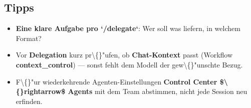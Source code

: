 \subsection{Tipps}

\begin{itemize}
\item \textbf{Eine klare Aufgabe pro `/delegate`}: Wer soll was liefern, in welchem Format?
\item Vor \textbf{Delegation} kurz pr\textbackslash\{\}"ufen, ob \textbf{Chat-Kontext} passt (Workflow \textbf{context\_control}) --- sonst fehlt dem Modell der gew\textbackslash\{\}"unschte Bezug.
\item F\textbackslash\{\}"ur wiederkehrende Agenten-Einstellungen \textbf{Control Center \$\textbackslash\{\}rightarrow\$ Agents} mit dem Team abstimmen, nicht jede Session neu erfinden.
\end{itemize}

